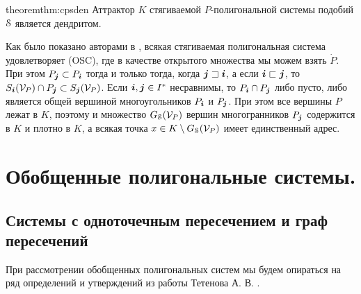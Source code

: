 \begin{restatethis}{theorem}{thm:cpsden} %
Аттрактор $K$  стягиваемой  $P$-полигональной системы подобий ${\EuScript S}$ является дендритом.
\end{restatethis}

Как было показано авторами в \cite[Theorem 4]{TSV2017}, всякая стягиваемая полигональная система удовлетворяет (OSC), где  в качестве открытого множества мы можем взять $\dot P$.
При этом $P_{\bm{j}}\subset P_{\bm{i}}$ тогда и только тогда, когда  ${\bm{j}}\sqsupset{\bm{i}}$, а если ${\bm{i}}\sqsubset{\bm{j}}$, то  $ S_{\bm{i}}({\mathcal V}_P)\cap P_{\bm{j}}\subset S_{\bm{j}}({\mathcal V}_P)$. 
Если ${\bm{i}},{\bm{j}}\in I^*$ несравнимы, то $P_{\bm{i}}\cap P_{\bm{j}}$ либо пусто, либо является  общей вершиной многоугольников $P_{\bm{i}}$ и  $P_{\bm{j}}$. 
При этом все вершины $P$ лежат в $K$, поэтому и множество $G_{\EuScript S}({\mathcal V}_P)$ вершин многогранников $P_{\bm{j}}$ содержится в $K$ и плотно в $K$, а всякая точка $x\in K\setminus G_{\EuScript S}({\mathcal V}_P)$ имеет единственный адрес.



\section{Обобщенные полигональные системы.} 

\subsection{Системы с одноточечным пересечением и граф пересечений}

При рассмотрении обобщенных полигональных систем мы будем опираться на ряд определений и утверждений из работы Тетенова А. В. \cite{FPS}.

